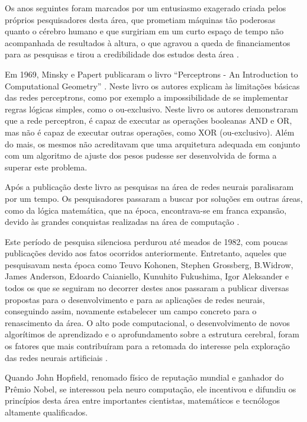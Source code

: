 Os anos seguintes foram marcados por um entusiasmo exagerado criada pelos próprios pesquisadores desta área, que prometiam máquinas tão poderosas quanto o cérebro humano e que surgiriam em um curto espaço de tempo não acompanhada de resultados à altura, o que agravou a queda de financiamentos para as pesquisas e tirou a credibilidade dos estudos desta área \cite{furtado2019redes}.

Em 1969, Minsky e Papert publicaram o livro “Perceptrons - An Introduction to Computational Geometry” \cite{minsky1969perceptrons}. Neste livro os autores explicam às limitações básicas das redes perceptrons, como por exemplo a impossibilidade de se implementar regras lógicas simples, como o ou-exclusivo. Neste livro os autores demonstraram que a rede perceptron, é capaz de executar as operações booleanas AND e OR, mas não é capaz de executar outras operações, como XOR (ou-exclusivo). Além do mais, os mesmos não acreditavam que uma arquitetura adequada em conjunto com um algoritmo de ajuste dos pesos pudesse ser desenvolvida de forma a superar este problema.

Após a publicação deste livro as pesquisas na área de redes neurais paralisaram por um tempo. Os pesquisadores passaram a buscar por soluções em outras áreas, como da lógica matemática, que na época, encontrava-se em franca expansão, devido às grandes conquistas realizadas na área de computação \cite{nocaoderna}.

Este período de pesquisa silenciosa perdurou até meados de 1982, com poucas publicações devido aos fatos ocorridos anteriormente. Entretanto, aqueles que pesquisavam nesta época como Teuvo Kohonen, Stephen Grossberg, B.Widrow, James Anderson, Edoardo Caianiello, Kunuhito Fukushima, Igor Aleksander e todos os que se seguiram no decorrer destes anos passaram a publicar diversas propostas para o desenvolvimento e para as aplicações de redes neurais, conseguindo assim, novamente estabelecer um campo concreto para o renascimento da área. O alto pode computacional, o desenvolvimento de novos algorítimos de aprendizado e o aprofundamento sobre a estrutura cerebral, foram os fatores que mais contribuíram para a retomada do interesse pela exploração das redes neurais artificiais \cite{nocaoderna}.

Quando John Hopfield, renomado físico de reputação mundial e ganhador do Prêmio
Nobel, se interessou pela neuro computação, ele incentivou e difundiu os princípios desta área entre importantes cientistas, matemáticos e tecnólogos altamente qualificados.

